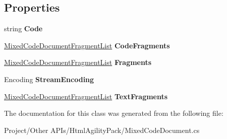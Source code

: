 \subsection*{Properties}
\begin{DoxyCompactItemize}
\item 
\mbox{\label{class_html_agility_pack_1_1_mixed_code_document_a8295c69e9cd60ccd925321b028bcdaee}} 
string {\bfseries Code}
\item 
\mbox{\label{class_html_agility_pack_1_1_mixed_code_document_a72bff321c598b027cb63141def4a6130}} 
\hyperlink{class_html_agility_pack_1_1_mixed_code_document_fragment_list}{Mixed\+Code\+Document\+Fragment\+List} {\bfseries Code\+Fragments}
\item 
\mbox{\label{class_html_agility_pack_1_1_mixed_code_document_ac4bf2dc75e1e79c8cdd57ea68b5d721c}} 
\hyperlink{class_html_agility_pack_1_1_mixed_code_document_fragment_list}{Mixed\+Code\+Document\+Fragment\+List} {\bfseries Fragments}
\item 
\mbox{\label{class_html_agility_pack_1_1_mixed_code_document_a3a0fe1737480646febba148cd4848305}} 
Encoding {\bfseries Stream\+Encoding}
\item 
\mbox{\label{class_html_agility_pack_1_1_mixed_code_document_ab94764beed2d88709c596a6b1946cbef}} 
\hyperlink{class_html_agility_pack_1_1_mixed_code_document_fragment_list}{Mixed\+Code\+Document\+Fragment\+List} {\bfseries Text\+Fragments}
\end{DoxyCompactItemize}


The documentation for this class was generated from the following file\+:\begin{DoxyCompactItemize}
\item 
Project/\+Other A\+P\+Is/\+Html\+Agility\+Pack/Mixed\+Code\+Document.\+cs\end{DoxyCompactItemize}
